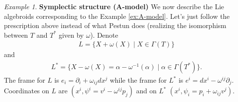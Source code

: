 \documentclass{article}
\newcommand{\ap}{\alpha}
\newcommand{\p}{\partial}
\newcommand{\se}{\Gamma}
\theoremstyle{definition}
\theoremstyle{definition}
\theoremstyle{remark}
\newtheorem{Ex}[theorem]{Example}
\theoremstyle{ref}
\begin{document}
\begin{Ex}
{\bf Symplectic structure (A-model)}
We now describe the Lie algebroids corresponding to the Example \eqref{ex:A-model}. Let's just follow the prescription above instead of what Pestun does (realizing the isomorphism between $T$ and $T^*$ given by $\omega$). Denote
\begin{align*}
L=\{X+\omega(X)\mid X \in \se(T)\}
\end{align*}
and 
\begin{align*}
L^*=\{X-\omega(X)=\ap-\omega^{-1}(\ap)\mid \ap \in \se(T^*)\}.
\end{align*}
The frame for $L$ is $e_i=\p_i+\omega_{ij}dx^j$ while the frame for $L^*$ is $e^i=dx^i-\omega^{ij}\p_j$. Coordinates on $L$ are $(x^i,\psi^i=v^i-\omega^{ij}p_j)$ and on $L^*$ $(x^i,\psi_i=p_i+\omega_{ij}v^j)$.



\end{Ex}
\end{document}
